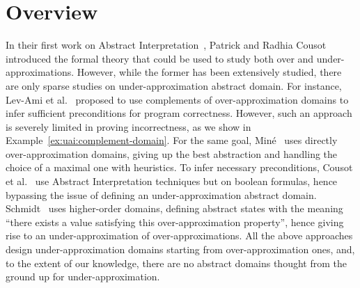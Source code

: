\section{Overview}
In their first work on Abstract Interpretation~\cite{CC77}, Patrick and Radhia Cousot introduced the formal theory that could be used to study both over and under-approximations.
However, while the former has been extensively studied, there are only sparse studies on under-approximation abstract domain.
For instance, Lev-Ami et al.~\cite{LSRG07} proposed to use complements of over-approximation domains to infer sufficient preconditions for program correctness. However, such an approach is severely limited in proving incorrectness, as we show in Example~\ref{ex:uai:complement-domain}.
For the same goal, Miné~\cite{Mine14} uses directly over-approximation domains, giving up the best abstraction and handling the choice of a maximal one with heuristics.
To infer necessary preconditions, Cousot et al.~\cite{CCL11,CCFL13} use Abstract Interpretation techniques but on boolean formulas, hence bypassing the issue of defining an under-approximation abstract domain.
Schmidt~\cite{Schmidt07} uses higher-order domains, defining abstract states with the meaning ``there exists a value satisfying this over-approximation property'', hence giving rise to an under-approximation of over-approximations.
All the above approaches design under-approximation domains starting from over-approximation ones, and, to the extent of our knowledge, there are no abstract domains thought from the ground up for under-approximation.

